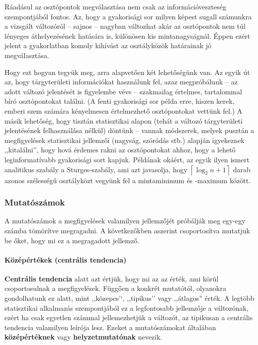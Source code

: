 \documentclass[]{book}
\let\oldparagraph\paragraph
\renewcommand{\paragraph}[1]{\oldparagraph{#1}\mbox{}}
\begin{document}
Ráadásul az osztópontok megválasztása nem csak az információveszteség szempontjából fontos. Az, hogy a gyakorisági sor milyen képest sugall számunkra a vizsgált változóról -- sajnos -- nagyban változhat akár az osztópontok nem túl lényeges áthelyezésének hatására is, különösen kis mintanagyságnál. Éppen ezért jelent a gyakorlatban komoly kihívást az osztályközök határainak jó megválasztása.

Hogy ezt hogyan tegyük meg, arra alapvetően két lehetőségünk van. Az egyik út az, hogy tárgyterületi információkat használunk fel, azaz megpróbálunk -- az adott változó jelentését is figyelembe véve -- szakmailag értelmes, tartalommal bíró osztópontokat találni. (A fenti gyakorisági sor példa erre, hiszen kerek, emberi szem számára kényelmesen értelmezhető osztópontokat vettünk fel.) A másik lehetőség, hogy tisztán statisztikai alapon (tehát a változó tárgyterületi jelentésének felhasználása nélkül) döntünk -- vannak módszerek, melyek pusztán a megfigyelések statisztikai jellemzői (nagyság, szóródás stb.) alapján igyekeznek ,,kitalálni'', hogy hová érdemes rakni az osztópontokat ahhoz, hogy a lehető leginformatívabb gyakorisági sort kapjuk. Példának okáért, az egyik ilyen ismert analitikus szabály a Sturges-szabály, ami azt javasolja, hogy \(\left\lceil \log_2 n+1\right\rceil\) darab azonos szélességű osztályközt vegyünk fel a mintaminimum és -maximum között.

\hypertarget{deskriptivmennyegyvaltanalitikusmutatoszamok}{%
\subsubsection{Mutatószámok}\label{deskriptivmennyegyvaltanalitikusmutatoszamok}}

A mutatószámok a megfigyelések valamilyen jellemzőjét próbálják meg egy-egy számba tömörítve megragadni. A következőkben aszerint csoportosítva mutatjuk be őket, hogy mi ez a megragadott jellemző.

\hypertarget{deskriptivmennyegyvaltanalitikusmutatoszamokcentralistendencia}{%
\paragraph{Középértékek (centrális tendencia)}\label{deskriptivmennyegyvaltanalitikusmutatoszamokcentralistendencia}}

\textbf{Centrális tendencia} alatt azt értjük, hogy mi az az érték, ami körül csoportosulnak a megfigyelések. Függően a konkrét mutatótól, olyanokra gondolhatunk ez alatt, mint ,,közepes'`, ,,tipikus'' vagy ,,átlagos'' érték. A legtöbb statisztikai alkalmazás szempontjából ez a legfontosabb jellemzője a változónak, ezért ha csak egyetlen számmal jellemezhetjük a változót, az tipikusan a centrális tendencia valamilyen leírója lesz. Ezeket a mutatószámokat általában \textbf{középértéknek} vagy \textbf{helyzetmutatónak} nevezik.
\end{document}
